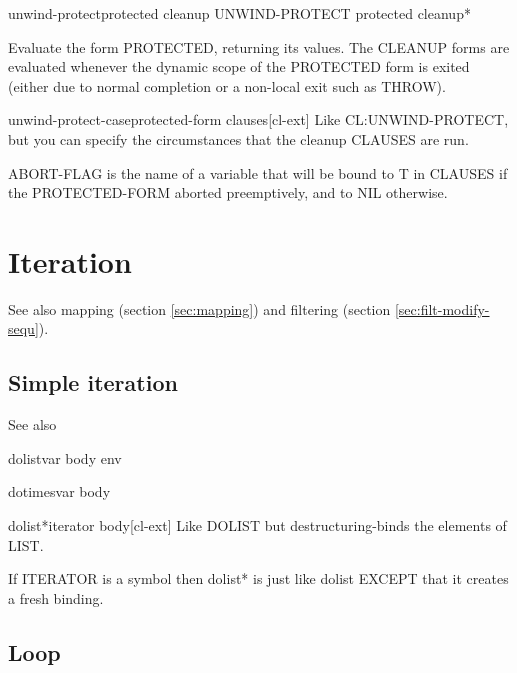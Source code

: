 \documentclass[10pt,english]{book}
\begin{document}
\begin{specialop}{unwind-protect}{protected \body cleanup}
  UNWIND-PROTECT protected cleanup*

Evaluate the form PROTECTED, returning its values. The CLEANUP forms are
evaluated whenever the dynamic scope of the PROTECTED form is exited (either
due to normal completion or a non-local exit such as THROW).
\end{specialop}

\begin{macro}{unwind-protect-case}{\op protected-form \body clauses}[cl-ext]
  Like CL:UNWIND-PROTECT, but you can specify the circumstances that
the cleanup CLAUSES are run.

ABORT-FLAG is the name of a variable that will be bound to T in
CLAUSES if the PROTECTED-FORM aborted preemptively, and to NIL
otherwise.
\end{macro}


\chapter{Iteration}
\label{cha:iteration}

See also mapping (section \ref{sec:mapping}) and filtering (section
\ref{sec:filt-modify-sequ}).

\section{Simple iteration}
\label{sec:simple-iteration}

See also 

\begin{macro}{dolist}{var \body body \env env}
  
\end{macro}

\begin{macro}{dotimes}{var \body body}
  
\end{macro}

\begin{macro}{dolist*}{iterator \body body}[cl-ext]
  Like DOLIST but destructuring-binds the elements of LIST.

If ITERATOR is a symbol then dolist* is just like dolist EXCEPT
that it creates a fresh binding.
\end{macro}

\section{Loop}
\label{sec:loop}
\end{document}
